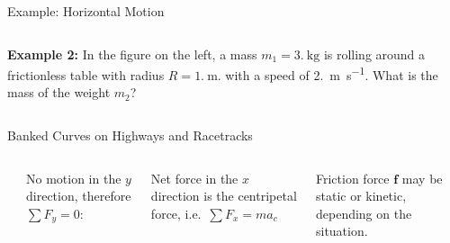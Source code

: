 \documentclass[12pt,compress,aspectratio=169]{beamer}
\begin{document}
\begin{frame}{Example: Horizontal Motion}
  \begin{columns}
    
    \textbf{Example 2:} In the figure on the left, a mass
    $m_1=\SI{3.}{\kilo\gram}$ is rolling around a frictionless table with
    radius $R=\SI{1.}\metre$. with a speed of \SI{2.}{\metre\per\second}.
    What is the mass of the weight $m_2$?
  \end{columns}
\end{frame}



\begin{frame}{Banked Curves on Highways and Racetracks}
  \begin{columns}
    \centering
    \\

    No motion in the $y$ direction, therefore $\sum F_y=0$:


    Net force in the $x$ direction is the centripetal force, i.e.\
    $\sum F_x=ma_c$


    Friction force $\bm{f}$ may be static or kinetic, depending on the
    situation.
  \end{columns}
\end{frame}
\end{document}
